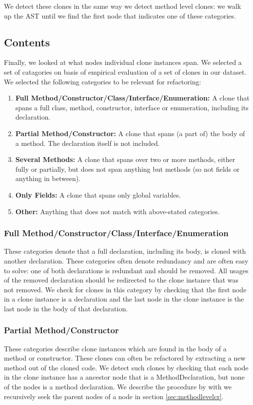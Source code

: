 We detect these clones in the same way we detect method level clones: we walk up the AST until we find the first node that indicates one of these categories.

\subsection{Contents}\label{sec:setupcontents}
Finally, we looked at what nodes individual clone instances span. We selected a set of catagories on basis of empirical evaluation of a set of clones in our dataset. We selected the following categories to be relevant for refactoring:
\begin{enumerate}
  \item \textbf{Full Method/Constructor/Class/Interface/Enumeration:} A clone that spans a full class, method, constructor, interface or enumeration, including its declaration.
  \item \textbf{Partial Method/Constructor:} A clone that spans (a part of) the body of a method. The declaration itself is not included.
  \item \textbf{Several Methods:} A clone that spans over two or more methods, either fully or partially, but does not span anything but methods (so not fields or anything in between).
  \item \textbf{Only Fields:} A clone that spans only global variables.
  \item \textbf{Other:} Anything that does not match with above-stated categories.
\end{enumerate}

\subsubsection{Full Method/Constructor/Class/Interface/Enumeration}
These categories denote that a full declaration, including its body, is cloned with another declaration. These categories often denote redundancy and are often easy to solve: one of both declarations is redundant and should be removed. All usages of the removed declaration should be redirected to the clone instance that was not removed. We check for clones in this category by checking that the first node in a clone instance is a declaration and the last node in the clone instance is the last node in the body of that declaration.

\subsubsection{Partial Method/Constructor}
These categories describe clone instances which are found in the body of a method or constructor. These clones can often be refactored by extracting a new method out of the cloned code. We detect such clones by checking that each node in the clone instance has a ancestor node that is a MethodDeclaration, but none of the nodes is a method declaration. We describe the procedure by with we recursively seek the parent nodes of a node in section \ref{sec:methodlevelcr}.

